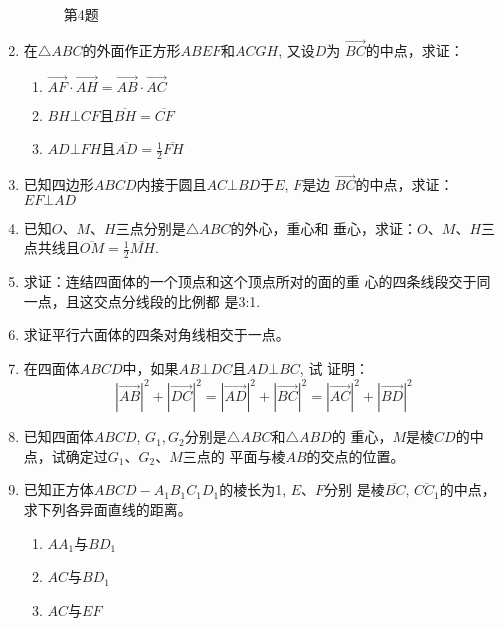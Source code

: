 \begin{enumerate}
\begin{figure}[htp]
    \caption*{第4题}
\end{figure}


\item 在$\triangle ABC$的外面作正方形$ABEF$和$ACGH$, 又设$D$为
$\Vec{BC}$的中点，求证：
\begin{enumerate}
    \item $\Vec{AF}\cdot \Vec{AH}=\Vec{AB}\cdot \Vec{AC}$
    \item $BH\bot CF$且$\overline{BH}=\overline{CF}$
    \item $AD\bot FH$且$\overline{AD}=\frac{1}{2} \overline{FH}$
\end{enumerate}

\item 已知四边形$ABCD$内接于圆且$AC\bot BD$于$E$, $F$是边
$\Vec{BC}$的中点，求证：$EF\bot AD$
\item 已知$O$、$M$、$H$三点分别是$\triangle ABC$的外心，重心和
垂心，求证：$O$、$M$、$H$三点共线且$\overline{OM}=\frac{1}{2}\overline{MH}$.
\item 求证：连结四面体的一个顶点和这个顶点所对的面的重
心的四条线段交于同一点，且这交点分线段的比例都
是3:1.
\item 求证平行六面体的四条对角线相交于一点。
\item 在四面体$ABCD$中，如果$AB\bot DC$且$AD\bot BC$, 试
证明：
\[|\Vec{AB}|^2+|\Vec{DC}|^2=|\Vec{AD}|^2+|\Vec{BC}|^2=|\Vec{AC}|^2+|\Vec{BD}|^2\]
\item 已知四面体$ABCD$, $G_1,G_2$分别是$\triangle ABC$和$\triangle ABD$的
重心，$M$是棱$CD$的中点，试确定过$G_1$、$G_2$、$M$三点的
平面与棱$AB$的交点的位置。
\item 已知正方体$ABCD-A_1B_1C_1D_1$的棱长为1, $E$、$F$分别
是棱$\overline{BC}$, $\overline{CC_1}$的中点，求下列各异面直线的距离。
\begin{multicols}{3}
    \begin{enumerate}
        \item $AA_1$与$BD_1$
        \item $AC$与$BD_1$
        \item $AC$与$EF$
    \end{enumerate}
\end{multicols}
\end{enumerate}